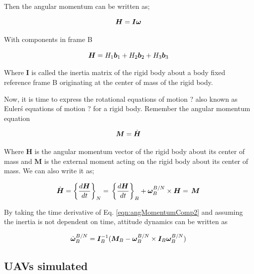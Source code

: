 Then the angular momentum can be written as;

\begin{equation}{\label{eqn:angMomentumComp2}}
\bm{H} = \bm{I} \bm{\omega}
\end{equation}

With components in frame B

\begin{equation}{\label{eqn:angMomentumComp}}
\bm{H} = H_1 \bm{b}_1 + H_2 \bm{b}_2 + H_3 \bm{b}_3 
\end{equation}

Where $\bm{I}$  is called the inertia matrix of the rigid body about a body fixed reference frame B originating at the center of mass of the rigid body.

Now, it is time to express the rotational equations of motion ? also  known as Euler\' s equations of motion ? for a rigid body.  Remember the angular momentum equation

\begin{equation}{\label{eqn:angMomentumComp}}
\bm{M} = \dot{\bm{H}} 
\end{equation}

Where $\bm{H}$ is the angular momentum vector of the rigid body about its center of mass and  $\bm{M}$ is the external moment acting on the rigid body about its center of mass.  We can also write it as;

\begin{equation}{\label{eqn:kinematicEquDQM}}
\dot{\bm{H}} = \bigg\{ \frac{d\bm{H}}{dt} \bigg\}_N 
=\,
\bigg\{ \frac{d\bm{H}}{dt} \bigg\}_B  + \bm{\omega}_B^{B/N} \times \bm{H}
 =\,
  \bm{M}
\end{equation}

By taking the time derivative of Eq. \ref{eqn:angMomentumComp2} and assuming the inertia is not dependent on time, attitude dynamics can be written as 

\begin{equation}{\label{eqn:kinematicEquDQM}}
\dot{\bm{\omega}}_B^{B/N}  = \bm{I}_B^{-1} (\bm{M}_B - \bm{\omega}_B^{B/N} \times \bm{I}_B \bm{\omega}_B^{B/N}) 
\end{equation}

\subsection{UAVs simulated}

